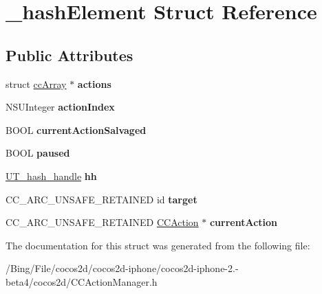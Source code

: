 \hypertarget{struct__hash_element}{\section{\-\_\-hash\-Element Struct Reference}
\label{struct__hash_element}
}
\subsection*{Public Attributes}
\begin{DoxyCompactItemize}
\item 
\hypertarget{struct__hash_element_aa29504e6bd43f1b78581d535ee28bb7f}{struct \hyperlink{structcc_array}{cc\-Array} $\ast$ {\bfseries actions}}\label{struct__hash_element_aa29504e6bd43f1b78581d535ee28bb7f}

\item 
\hypertarget{struct__hash_element_a539b7ce4e22be6e78afdc88986f4aad6}{N\-S\-U\-Integer {\bfseries action\-Index}}\label{struct__hash_element_a539b7ce4e22be6e78afdc88986f4aad6}

\item 
\hypertarget{struct__hash_element_ab5ee5744445fc96648318cd20e4907ac}{B\-O\-O\-L {\bfseries current\-Action\-Salvaged}}\label{struct__hash_element_ab5ee5744445fc96648318cd20e4907ac}

\item 
\hypertarget{struct__hash_element_a90c11df9075d30d6f1ffd67b27019313}{B\-O\-O\-L {\bfseries paused}}\label{struct__hash_element_a90c11df9075d30d6f1ffd67b27019313}

\item 
\hypertarget{struct__hash_element_a478c5e7c62426f22612799d32ee2234f}{\hyperlink{struct_u_t__hash__handle}{U\-T\-\_\-hash\-\_\-handle} {\bfseries hh}}\label{struct__hash_element_a478c5e7c62426f22612799d32ee2234f}

\item 
\hypertarget{struct__hash_element_a26c51f054b066e23b1b82e5bf1978406}{C\-C\-\_\-\-A\-R\-C\-\_\-\-U\-N\-S\-A\-F\-E\-\_\-\-R\-E\-T\-A\-I\-N\-E\-D id {\bfseries target}}\label{struct__hash_element_a26c51f054b066e23b1b82e5bf1978406}

\item 
\hypertarget{struct__hash_element_adcde4b71e1d011b2539ced5f7560d2c1}{C\-C\-\_\-\-A\-R\-C\-\_\-\-U\-N\-S\-A\-F\-E\-\_\-\-R\-E\-T\-A\-I\-N\-E\-D \hyperlink{interface_c_c_action}{C\-C\-Action} $\ast$ {\bfseries current\-Action}}\label{struct__hash_element_adcde4b71e1d011b2539ced5f7560d2c1}

\end{DoxyCompactItemize}


The documentation for this struct was generated from the following file\-:\begin{DoxyCompactItemize}
\item 
/\-Bing/\-File/cocos2d/cocos2d-\/iphone/cocos2d-\/iphone-\/2.-\/beta4/cocos2d/C\-C\-Action\-Manager.\-h\end{DoxyCompactItemize}
